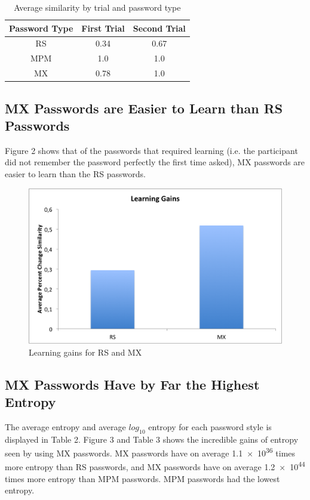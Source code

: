 \documentclass{article}
\begin{document}
\begin{table}
\centering
\begin{tabular}{|c|c|c|}
\hline
Password Type & First Trial & Second Trial \\
\hline
RS & 0.34 & 0.67 \\
\hline
MPM & 1.0 & 1.0 \\
\hline
MX & 0.78 & 1.0 \\
\hline
\end{tabular}
\caption{Average similarity by trial and password type}
\end{table}

\subsection*{MX Passwords are Easier to Learn than RS Passwords}
Figure 2 shows that of the passwords that required learning (i.e. the participant did not remember the password perfectly the first time asked), MX passwords are easier to learn than the RS passwords. 
\begin{figure}[h]
\centering
\includegraphics[scale=0.7]{learningGains.png}
\caption{Learning gains for RS and MX}
\end{figure}

\subsection*{MX Passwords Have by Far the Highest Entropy}
The average  entropy and average $log_{10}$ entropy for each password style is displayed in Table 2. Figure 3 and Table 3 shows the incredible gains of entropy seen by using MX passwords. MX passwords have on average \num{1.1e36} times more entropy than RS passwords, and MX passwords have on average \num{1.2e44} times more entropy than MPM passwords. MPM passwords had the lowest entropy. 
\end{document}
